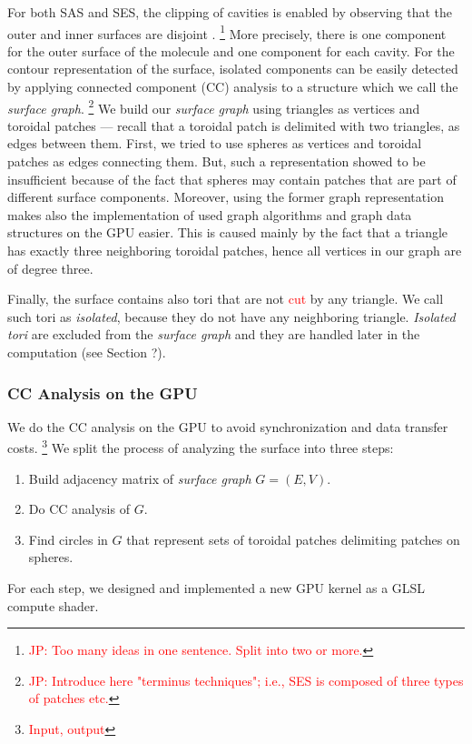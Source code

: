 For both SAS and SES, the clipping of cavities is enabled by observing that the outer and inner surfaces are disjoint \textcolor{red}{\cite{borland2011ambient}}.
\footnote{\textcolor{red}{JP: Too many ideas in one sentence. Split into two or more.}}
More precisely, there is one component for the outer surface of the molecule and one component for each cavity.
For the contour representation of the surface, isolated components can be easily detected by applying connected component (CC) analysis to a structure which we call the \textit{surface graph}.
\footnote{\textcolor{red}{JP: Introduce here "terminus techniques"; i.e., SES is composed of three types of patches etc.}}
We build our \textit{surface graph} using triangles as vertices and toroidal patches --- recall that a toroidal patch is delimited with two triangles, as edges between them.
First, we tried to use spheres as vertices and toroidal patches as edges connecting them. But, such a representation showed to be insufficient because of the fact that spheres may contain patches that are part of different surface components.
Moreover, using the former graph representation makes also the implementation of used graph algorithms and graph data structures on the GPU easier.
This is caused mainly by the fact that a triangle has exactly three neighboring toroidal patches, hence all vertices in our graph are of degree three.

Finally, the surface contains also tori that are not \textcolor{red}{cut} by any triangle.
We call such tori as \textit{isolated}, because they do not have any neighboring triangle.
\textit{Isolated tori} are excluded from the \textit{surface graph} and they are handled later in the computation (see Section ?).

\subsubsection{CC Analysis on the GPU}

We do the CC analysis on the GPU to avoid synchronization and data transfer costs.
\footnote{\textcolor{red}{Input, output}}
We split the process of analyzing the surface into three steps:
\begin{enumerate}
  \item Build adjacency matrix of \textit{surface graph} $G = (E, V)$.
	\item Do CC analysis of $G$.
	\item Find circles in $G$ that represent sets of toroidal patches delimiting patches on spheres.
\end{enumerate}
For each step, we designed and implemented a new GPU kernel as a GLSL compute shader.

